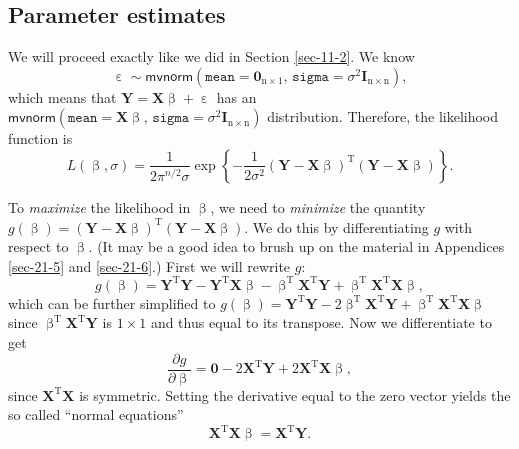\documentclass[captions=tableheading]{scrbook}
\begin{document}
\subsection{Parameter estimates}
\label{sec-12-2-1}
\label{sub-mlr-parameter-estimates}


We will proceed exactly like we did in Section \ref{sec-11-2}. We know
\begin{equation}
\upepsilon\sim\mathsf{mvnorm}\left(\mathtt{mean}=\mathbf{0}_{\mathrm{n}\times1},\,\mathtt{sigma}=\sigma^{2}\mathbf{I}_{\mathrm{n}\times\mathrm{n}}\right),
\end{equation}
which means that \(\mathbf{Y}=\mathbf{X}\upbeta+\upepsilon\) has an \(\mathsf{mvnorm}\left(\mathtt{mean}=\mathbf{X}\upbeta,\,\mathtt{sigma}=\sigma^{2}\mathbf{I}_{\mathrm{n}\times\mathrm{n}}\right)\) distribution. Therefore, the likelihood function is
\begin{equation}
L(\upbeta,\sigma)=\frac{1}{2\pi^{n/2}\sigma}\exp\left\{ -\frac{1}{2\sigma^{2}}\left(\mathbf{Y}-\mathbf{X}\upbeta\right)^{\mathrm{T}}\left(\mathbf{Y}-\mathbf{X}\upbeta\right)\right\}.
\end{equation}

To \emph{maximize} the likelihood in \(\upbeta\), we need to \emph{minimize} the quantity \(g(\upbeta)=\left(\mathbf{Y}-\mathbf{X}\upbeta\right)^{\mathrm{T}}\left(\mathbf{Y}-\mathbf{X}\upbeta\right)\). We do this by differentiating \(g\) with respect to \(\upbeta\). (It may be a good idea to brush up on the material in Appendices \ref{sec-21-5} and \ref{sec-21-6}.) First we will rewrite \(g\):
\begin{equation}
g(\upbeta)=\mathbf{Y}^{\mathrm{T}}\mathbf{Y}-\mathbf{Y}^{\mathrm{T}}\mathbf{X}\upbeta-\upbeta^{\mathrm{T}}\mathbf{X}^{\mathrm{T}}\mathbf{Y}+\upbeta^{\mathrm{T}}\mathbf{X}^{\mathrm{T}}\mathbf{X}\upbeta,
\end{equation}
which can be further simplified to \(g(\upbeta)=\mathbf{Y}^{\mathrm{T}}\mathbf{Y}-2\upbeta^{\mathrm{T}}\mathbf{X}^{\mathrm{T}}\mathbf{Y}+\upbeta^{\mathrm{T}}\mathbf{X}^{\mathrm{T}}\mathbf{X}\upbeta\) since \(\upbeta^{\mathrm{T}}\mathbf{X}^{\mathrm{T}}\mathbf{Y}\) is \(1\times1\) and thus equal to its transpose. Now we differentiate to get
\begin{equation}
\frac{\partial g}{\partial\upbeta}=\mathbf{0}-2\mathbf{X}^{\mathrm{T}}\mathbf{Y}+2\mathbf{X}^{\mathrm{T}}\mathbf{X}\upbeta,
\end{equation}
since \(\mathbf{X}^{\mathrm{T}}\mathbf{X}\) is symmetric. Setting the derivative equal to the zero vector yields the so called ``normal equations''
\begin{equation}
\mathbf{X}^{\mathrm{T}}\mathbf{X}\upbeta=\mathbf{X}^{\mathrm{T}}\mathbf{Y}.
\end{equation}
\end{document}
